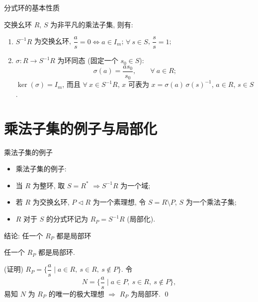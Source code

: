 \begin{frame}{分式环的基本性质}

\begin{lem}[分式环]
交换幺环 $R$, $S$ 为非平凡的乘法子集, 则有:
\begin{enumerate}
\item[(i)] $S^{-1} R$ 为交换幺环,
  $\dfrac{a}{s} = 0 \iff a \in I_m$;
  $\forall\ s \in S$, $\dfrac{s}{s} = 1$;
\item[(ii)] $\sigma: R \to S^{-1} R$ 为环同态 (固定一个 $s_0 \in S$):
  \[
  \sigma(a) = \frac{a s_0}{s_0},
  \qquad \forall\ a \in R ;
  \]
  $\ker(\sigma) = I_m$, 而且 $\forall\ x \in S^{-1} R$, $x$ 可表为
  $x = \sigma(a) \, \sigma(s)^{-1}$,
  $a \in R$, $s \in S$.
\end{enumerate}
\end{lem}

\end{frame}


\section[局部化]{乘法子集的例子与局部化}


\begin{frame}{乘法子集的例子}

\begin{itemize}
\item 乘法子集的例子:
\item[①.] 当 $R$ 为整环, 取 $S = R^{*}$
  $\Longrightarrow S^{-1} R$ 为一个域;
\item[②.] 若 $R$ 为交换幺环, $P \lhd R$ 为一个素理想, 令 $S = R \setminus P$,
  $S$ 为一个乘法子集;
\item $R$ 对于 $S$ 的分式环记为 $R_P = S^{-1} R$ (局部化).
\end{itemize}

\end{frame}


\begin{frame}{结论: 任一个 $R_P$ 都是局部环}

\begin{thm}[结论]
任一个 $R_P$ 都是局部环.
\end{thm}

\startproof[bg=yellow, fg=red](证明)
$R_P = \Big\{ \dfrac{a}{s} \;\Big|\; a \in R,\ s \in R,\ s \notin P \Big\}$.
令
\[
N = \Big\{ \frac{a}{s} \;\Big|\; a \in P,\ s \in R,\ s \notin P \Big\} ,
\]
易知 $N$ 为 $R_P$ 的唯一的极大理想 $\Longrightarrow$ $R_P$ 为局部环.
\qed

\end{frame}

